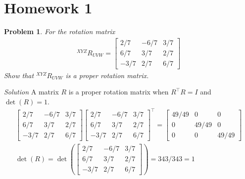 \documentclass{article}
\newtheorem{prob}{Problem}
\numberwithin{prob}{section}
\newenvironment{solution}{\emph{Solution}}{}
\begin{document}
\section{Homework 1}

\begin{prob}
  For the rotation matrix
  \begin{align}
  ^{XYZ}R_{UVW} = \begin{bmatrix}
    2/7 & -6/7 & 3/7\\
   6/7 & 3/7 & 2/7\\
   -3/7 & 2/7 & 6/7
  \end{bmatrix}
\end{align}
Show that $^{XYZ}R_{UVW}$ is a proper rotation matrix.
\end{prob}
\begin{solution}
A matrix $R$ is a proper rotation matrix when $R^\top R = I$ and $\det(R) = 1$. 
\begin{align}
\begin{bmatrix}
    2/7 & -6/7 & 3/7\\
   6/7 & 3/7 & 2/7\\
   -3/7 & 2/7 & 6/7
  \end{bmatrix}
\begin{bmatrix}
2/7 & -6/7 & 3/7\\
6/7 & 3/7 & 2/7\\
-3/7 & 2/7 & 6/7
\end{bmatrix}^\top = 
\begin{bmatrix}
  49/49 & 0 & 0 \\
  0 & 49/49 & 0\\
  0 & 0 & 49/49 
\end{bmatrix} \\
\det(R) = 
\det(\begin{bmatrix}
    2/7 & -6/7 & 3/7\\
   6/7 & 3/7 & 2/7\\
   -3/7 & 2/7 & 6/7
  \end{bmatrix}) = 343/343 = 1
\end{align}
\end{solution}
\end{document}
